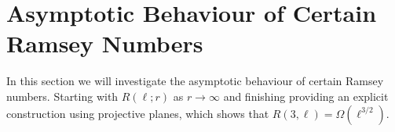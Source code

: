 \section{Asymptotic Behaviour of Certain Ramsey Numbers}\label{sec:ass_ramsey}
In this section we will investigate the asymptotic behaviour of certain Ramsey numbers. Starting with $R(\ell; r)$ as $r \to \infty$ and finishing providing an explicit construction using projective planes, which shows that $R(3, \ell) = \Omega(\ell^{3 / 2})$.


